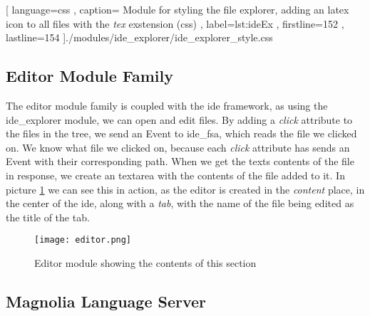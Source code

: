 \begin{center}
  
    [ language=css
    , caption={
      Module for styling the file explorer, adding an latex icon to all files
      with the \textit{tex} exstension (\gls{css})
    }
    , label=lst:ideEx
    , firstline=152
    , lastline=154
    ]{./modules/ide\_explorer/ide\_explorer\_style.css}
\end{center}

\subsection{Editor Module Family}

The editor module family is coupled with the \gls{ide} framework, as using the
ide\_explorer module, we can open and edit files. By adding a \textit{click}
attribute to the files in the tree, we send an Event to \gls{ide}\_fsa, which
reads the file we clicked on. We know what file we clicked on, because each
\textit{click} attribute has sends an Event with their corresponding path. When
we get the texts contents of the file in response, we create an textarea with
the contents of the file added to it. In picture \ref{pic:editorModule} we can
see this in action, as the editor is created in the \textit{content} place, in
the center of the \gls{ide}, along with a \textit{tab}, with the name of the
file being edited as the title of the tab.

\begin{figure}
  \centering
  \texttt{[image: editor.png]}
  \caption{
    Editor module showing the contents of this section
  }
  \label{pic:editorModule}
\end{figure}

\subsection{Magnolia Language Server}

